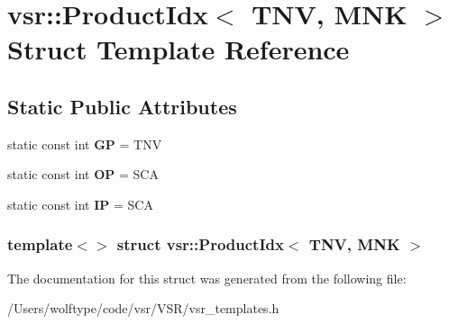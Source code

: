 \hypertarget{structvsr_1_1_product_idx_3_01_t_n_v_00_01_m_n_k_01_4}{\section{vsr\-:\-:Product\-Idx$<$ T\-N\-V, M\-N\-K $>$ Struct Template Reference}
\label{structvsr_1_1_product_idx_3_01_t_n_v_00_01_m_n_k_01_4}
}
\subsection*{Static Public Attributes}
\begin{DoxyCompactItemize}
\item 
\hypertarget{structvsr_1_1_product_idx_3_01_t_n_v_00_01_m_n_k_01_4_a55be8a1616e27f4c9394a3778708517c}{static const int {\bfseries G\-P} = T\-N\-V}\label{structvsr_1_1_product_idx_3_01_t_n_v_00_01_m_n_k_01_4_a55be8a1616e27f4c9394a3778708517c}

\item 
\hypertarget{structvsr_1_1_product_idx_3_01_t_n_v_00_01_m_n_k_01_4_a88b0f7671b2354b12ef99480b2ca1e17}{static const int {\bfseries O\-P} = S\-C\-A}\label{structvsr_1_1_product_idx_3_01_t_n_v_00_01_m_n_k_01_4_a88b0f7671b2354b12ef99480b2ca1e17}

\item 
\hypertarget{structvsr_1_1_product_idx_3_01_t_n_v_00_01_m_n_k_01_4_ab8f36b378a6589794f5ca794d1089484}{static const int {\bfseries I\-P} = S\-C\-A}\label{structvsr_1_1_product_idx_3_01_t_n_v_00_01_m_n_k_01_4_ab8f36b378a6589794f5ca794d1089484}

\end{DoxyCompactItemize}
\subsubsection*{template$<$$>$ struct vsr\-::\-Product\-Idx$<$ T\-N\-V, M\-N\-K $>$}



The documentation for this struct was generated from the following file\-:\begin{DoxyCompactItemize}
\item 
/\-Users/wolftype/code/vsr/\-V\-S\-R/vsr\-\_\-templates.\-h\end{DoxyCompactItemize}
